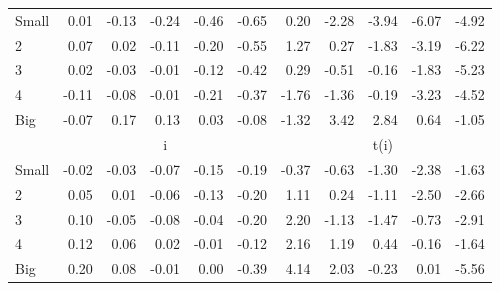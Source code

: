 \begin{table}[!ht]
\begin{tabular}{lrrrrrrrrrr}
    \\
      \cmidrule(r){2-6} \cmidrule(r){7-11}

    Small   & 0.01  & -0.13  & -0.24  & -0.46  & -0.65  & 0.20  & -2.28  & -3.94  & -6.07  & -4.92  \\
         2  & 0.07  & 0.02  & -0.11  & -0.20  & -0.55  & 1.27  & 0.27  & -1.83  & -3.19  & -6.22  \\
         3  & 0.02  & -0.03  & -0.01  & -0.12  & -0.42  & 0.29  & -0.51  & -0.16  & -1.83  & -5.23  \\
         4  & -0.11  & -0.08  & -0.01  & -0.21  & -0.37  & -1.76  & -1.36  & -0.19  & -3.23  & -4.52  \\
    Big     & -0.07  & 0.17  & 0.13  & 0.03  & -0.08  & -1.32  & 3.42  & 2.84  & 0.64  & -1.05  \\

  
    
      & \multicolumn{5}{c}{i} & \multicolumn{5}{c}{t(i)}
    
    \\
      \cmidrule(r){2-6} \cmidrule(r){7-11}

    Small   & -0.02  & -0.03  & -0.07  & -0.15  & -0.19  & -0.37  & -0.63  & -1.30  & -2.38  & -1.63  \\
         2  & 0.05  & 0.01  & -0.06  & -0.13  & -0.20  & 1.11  & 0.24  & -1.11  & -2.50  & -2.66  \\
         3  & 0.10  & -0.05  & -0.08  & -0.04  & -0.20  & 2.20  & -1.13  & -1.47  & -0.73  & -2.91  \\
         4  & 0.12  & 0.06  & 0.02  & -0.01  & -0.12  & 2.16  & 1.19  & 0.44  & -0.16  & -1.64  \\
    Big     & 0.20  & 0.08  & -0.01  & 0.00  & -0.39  & 4.14  & 2.03  & -0.23  & 0.01  & -5.56  \\

  

  \bottomrule
\end{tabular}
\label{tbl:25_Size_Var_FF2016}
\end{table}